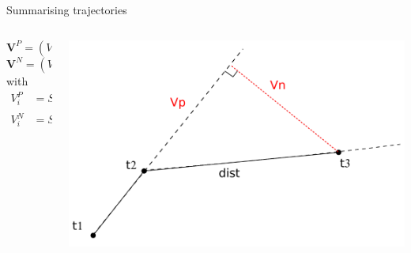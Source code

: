 \documentclass{beamer}\usepackage[]{graphicx}\usepackage[]{color}
\begin{document}
\begin{frame}{Summarising trajectories}
{\begin{columns}
\begin{column}{0.4\textwidth}
  $$\boldsymbol{V}^P=(V^P_{2}, \ldots,V^P_{N})$$
    $$\boldsymbol{V}^N=(V^N_{2}, \ldots,V^N_{N})$$
    with 
  \begin{align*}
  V^P_i&=S_i \, cos(\phi_i)\\
  V^N_i&=S_i \, sin(\phi_i)
  \end{align*}
  \end{column}
  \begin{column}{0.6\textwidth}
  \includegraphics[scale=0.3]{Speed2.pdf}
  \end{column}
  \end{columns}
}
\end{frame}
\end{document}
